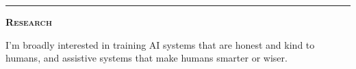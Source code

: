 \documentclass[11 pt]{article}
\begin{document}
\begin{itemize}







\end{itemize}

\vspace{8pt}

\hrule

\begin{center}\begin{Large}\textsc{\textbf{Research}\\}\end{Large}\end{center}

I'm broadly interested in training AI systems that are honest and kind to humans, and assistive systems that make humans smarter or wiser.
\end{document}

